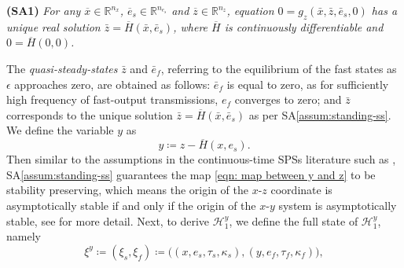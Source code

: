 \begin{sassum}\label{assum:standing-ss} \rm 
\textbf{(SA1)} \it
For any $\overline{x}\in \mathbb{R}^{n_x}$, $\overline{e}_s\in \mathbb{R}^{n_{e_s}}$ and $\overline{z}\in \mathbb{R}^{n_z}$, equation $ 0 = g_z\left(\bar x,\bar z, \bar e_{s},0\right)$ has a unique real solution $\bar z = \overline{H}(\bar x,  \bar e_{s})$, where $\overline{H}$ is continuously differentiable and $0 =\overline{H}(0, 0)$.
\end{sassum}

%
The \emph{quasi-steady-states} $\bar z$ and $\bar e_{f}$, referring to the equilibrium of the fast states as $\epsilon$ approaches zero, are obtained as follows:
$\bar{e}_f$ is equal to zero, as  for sufficiently high frequency of fast-output transmissions, $e_f$ converges to zero; and $\bar{z}$ corresponds to the unique solution $\bar z = \overline{H}(\bar x,  \bar e_{s})$ as per SA\ref{assum:standing-ss}.
%
We define the variable $y$ as
\begin{equation}
    y\coloneqq z - \overline{H}(x, e_{s}).
    \label{eqn: map between y and z}
\end{equation}
Then similar to the assumptions in the continuous-time SPSs literature such as \cite{nonlinear_systems_Khalil,christofides1996singular}, SA\ref{assum:standing-ss} guarantees the map \eqref{eqn: map between y and z} to be stability preserving, which means the origin of the $x$-$z$ coordinate is asymptotically stable if and only if the origin of the $x$-$y$ system is asymptotically stable, see \cite[Section 11.5]{nonlinear_systems_Khalil} for more detail.
%
%
Next, to derive $\mathcal{H}_1^y$, we define the full state of $\mathcal{H}_1^y$, namely 
\begin{equation}
    \xi^y \coloneqq (\xi_s, \xi_f) \coloneqq \big((x,e_s,\tau_s, \kappa_s), (y,e_f, \tau_f, \kappa_f)\big),
    \label{eqn: definition of xi_s and xi_f}
\end{equation}
